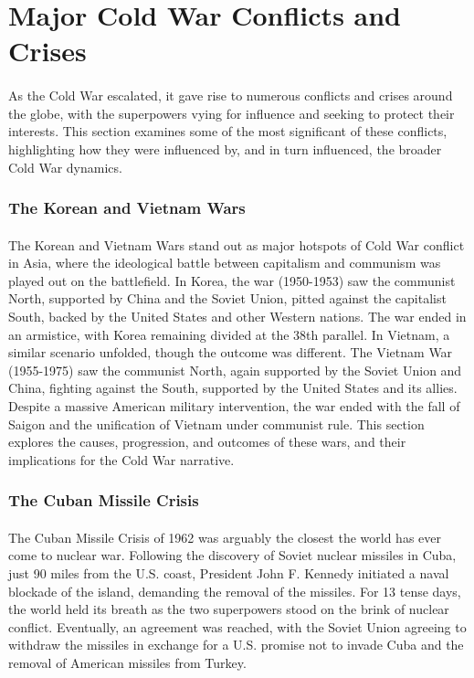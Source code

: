 \documentclass[a4paper,12pt]{book}
\begin{document}
\section*{Major Cold War Conflicts and Crises}
\paragraph{}
As the Cold War escalated, it gave rise to numerous conflicts and crises around the globe, with the superpowers vying for influence and seeking to protect their interests. This section examines some of the most significant of these conflicts, highlighting how they were influenced by, and in turn influenced, the broader Cold War dynamics.

\subsubsection*{The Korean and Vietnam Wars}
\paragraph{}
The Korean and Vietnam Wars stand out as major hotspots of Cold War conflict in Asia, where the ideological battle between capitalism and communism was played out on the battlefield. In Korea, the war (1950-1953) saw the communist North, supported by China and the Soviet Union, pitted against the capitalist South, backed by the United States and other Western nations. The war ended in an armistice, with Korea remaining divided at the 38th parallel. In Vietnam, a similar scenario unfolded, though the outcome was different. The Vietnam War (1955-1975) saw the communist North, again supported by the Soviet Union and China, fighting against the South, supported by the United States and its allies. Despite a massive American military intervention, the war ended with the fall of Saigon and the unification of Vietnam under communist rule. This section explores the causes, progression, and outcomes of these wars, and their implications for the Cold War narrative.

\subsubsection*{The Cuban Missile Crisis}
\paragraph{}
The Cuban Missile Crisis of 1962 was arguably the closest the world has ever come to nuclear war. Following the discovery of Soviet nuclear missiles in Cuba, just 90 miles from the U.S. coast, President John F. Kennedy initiated a naval blockade of the island, demanding the removal of the missiles. For 13 tense days, the world held its breath as the two superpowers stood on the brink of nuclear conflict. Eventually, an agreement was reached, with the Soviet Union agreeing to withdraw the missiles in exchange for a U.S. promise not to invade Cuba and the removal of American missiles from Turkey. 
\end{document}
